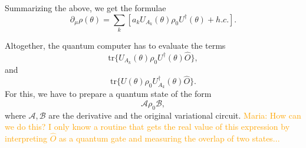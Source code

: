 \documentclass[amsmath,amssymb,aps,pra,10pt,twocolumn,groupedaddress,nofootinbib]{revtex4-1}
\newcommand{\tr}{\mathrm{tr}}
\newcommand{\maria}[1]{\textcolor{orange}{Maria: #1}}
\begin{document}
Summarizing the above, we get the formulae
\begin{equation*}
	\partial_{\mu}  \rho(\theta) =  \sum_k \left[ a_k  U_{A_k}(\theta) \rho_0 U^{\dagger}(\theta) + h.c. \right].
\end{equation*}

Altogether, the quantum computer has to evaluate the terms 
\[ \tr \{  U_{A_k}(\theta) \rho_0 U^{\dagger}(\theta)  \hat{O} \},\]
and
\[ \tr \{  U(\theta) \rho_0 U_{A_k}^{\dagger}(\theta)  \hat{O} \}.\]
For this, we have to prepare a quantum state of the form
\[ \mathcal{A} \rho_0 \mathcal{B}, \]
where $ \mathcal{A}, \mathcal{B}$ are the derivative and the original variational circuit. \maria{How can we do this? I only know a routine that gets the real value of this expression by interpreting $\hat{O}$ as a quantum gate and measuring the overlap of two states...}

%
%
\end{document}
